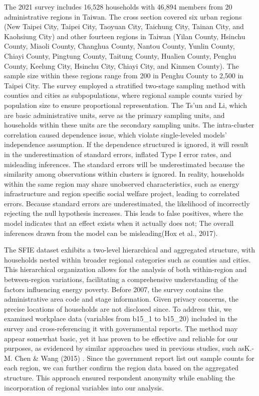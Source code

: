\documentclass[
  twoside,
  openright,
  degree    = master,               %
  language  = english,              %
  fontset   = overleaf,             %
  watermark = true,                 %
  doi       = true,                 %
]{ntuthesis}
\begin{document}
The 2021 survey includes 16,528 households with 46,894 members from 20
administrative regions in Taiwan. The cross section covered six urban
regions (New Taipei City, Taipei City, Taoyuan City, Taichung City,
Tainan City, and Kaohsiung City) and other fourteen regions in Taiwan
(Yilan County, Hsinchu County, Miaoli County, Changhua County, Nantou
County, Yunlin County, Chiayi County, Pingtung County, Taitung County,
Hualien County, Penghu County, Keelung City, Hsinchu City, Chiayi City,
and Kinmen County). The sample size within these regions range from 200
in Penghu County to 2,500 in Taipei City. The survey employed a
stratified two-stage sampling method with counties and cities as
subpopulations, where regional sample counts varied by population size
to ensure proportional representation. The Ts'un and Li, which are basic
administrative units, serve as the primary sampling units, and
households within these units are the secondary sampling units. The
intra-cluster correlation caused dependence issue, which violate
single-leveled models' independence assumption. If the dependence
structured is ignored, it will result in the underestimation of standard
errors, inflated Type I error rates, and misleading inferences. The
standard errors will be underestimated because the similarity among
observations within clusters is ignored. In reality, households within
the same region may share unobserved characteristics, such as energy
infrastructure and region specific social welfare project, leading to
correlated errors. Because standard errors are underestimated, the
likelihood of incorrectly rejecting the null hypothesis increases. This
leads to false positives, where the model indicates that an effect
exists when it actually does not; The overall inferences drawn from the
model can be misleading(Hox et al., 2017).

The SFIE dataset exhibits a two-level hierarchical and aggregated
structure, with households nested within broader regional categories
such as counties and cities. This hierarchical organization allows for
the analysis of both within-region and between-region variations,
facilitating a comprehensive understanding of the factors influencing
energy poverty. Before 2007, the survey contains the administrative area
code and stage information. Given privacy concerns, the precise
locations of households are not disclosed since. To address this, we
examined workplace data (variables from b15\_1 to b15\_20) included in
the survey and cross-referencing it with governmental reports. The
method may appear somewhat basic, yet it has proven to be effective and
reliable for our purposes, as evidenced by similar approaches used in
previous studies, such asK.-M. Chen \& Wang (2015) . Since the
government report list out sample counts for each region, we can further
confirm the region data based on the aggregated structure. This approach
ensured respondent anonymity while enabling the incorporation of
regional variables into our analysis.
\end{document}
